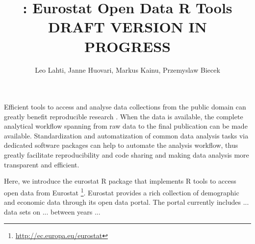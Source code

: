 \title{: Eurostat Open Data R Tools\\DRAFT VERSION IN PROGRESS}
\author{Leo Lahti, Janne Huovari, Markus Kainu, Przemyslaw Biecek}

\maketitle


Efficient tools to access and analyse data collections from the public
domain can greatly benefit reproducible research \citep{Gandrud13,
Boettiger2015}. When the data is available, the complete analytical
workflow spanning from raw data to the final publication can be made
available. Standardization and automatization of common data analysis
tasks via dedicated software packages can help to automate the
analysis workflow, thus greatly facilitate reproducibility and code
sharing and making data analysis more transparent and efficient.

Here, we introduce the eurostat R package that implements R tools to
access open data from
Eurostat \footnote{\url{http://ec.europa.eu/eurostat}}. Eurostat
provides a rich collection of demographic and economic data through
its open data portal. The portal currently includes ... data sets on
... between years ...

